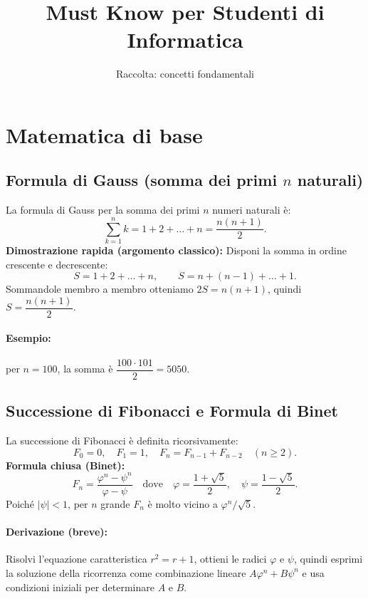 \documentclass[11pt,a4paper]{article}
\title{Must Know per Studenti di Informatica}
\author{Raccolta: concetti fondamentali}
\let\oldsection\section
\renewcommand{\section}{\clearpage\oldsection}
\begin{document}
\maketitle
\tableofcontents
\bigskip



\section{Matematica di base}

\subsection{Formula di Gauss (somma dei primi \(n\) naturali)}
La formula di Gauss per la somma dei primi \(n\) numeri naturali è:
\[
\sum_{k=1}^n k = 1 + 2 + \dots + n = \frac{n(n+1)}{2}.
\]
\textbf{Dimostrazione rapida (argomento classico):} Disponi la somma in ordine crescente e decrescente:
\[
S = 1 + 2 + \dots + n,
\qquad
S = n + (n-1) + \dots + 1.
\]
Sommandole membro a membro otteniamo \(2S = n(n+1)\), quindi \(S = \dfrac{n(n+1)}{2}\).

\paragraph{Esempio:} per \(n=100\), la somma è \(\dfrac{100\cdot 101}{2} = 5050\).

\subsection{Successione di Fibonacci e Formula di Binet}
La successione di Fibonacci è definita ricorsivamente:
\[
F_0 = 0,\quad F_1 = 1,\quad F_{n} = F_{n-1} + F_{n-2}\quad (n\ge 2).
\]
\textbf{Formula chiusa (Binet):}
\[
F_n = \frac{\varphi^n - \psi^n}{\varphi - \psi}
\quad\text{dove}\quad
\varphi = \frac{1+\sqrt{5}}{2},\quad \psi = \frac{1-\sqrt{5}}{2}.
\]
Poiché \(|\psi|<1\), per \(n\) grande \(F_n\) è molto vicino a \(\varphi^n/\sqrt{5}\).

\paragraph{Derivazione (breve):} Risolvi l'equazione caratteristica \(r^2 = r + 1\), ottieni le radici \(\varphi\) e \(\psi\), quindi esprimi la soluzione della ricorrenza come combinazione lineare \(A\varphi^n + B\psi^n\) e usa condizioni iniziali per determinare \(A\) e \(B\).
\end{document}
